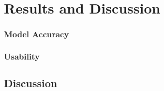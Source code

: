 \chapter{Results and Discussion}

\subsection{Model Accuracy}


\subsection{Usability}

\section{Discussion}


